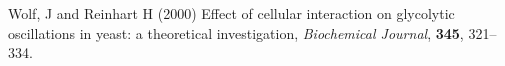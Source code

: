 \documentclass{bioinfo}
\begin{document}
\begin{thebibliography}{}
 Wolf, J and Reinhart H (2000) Effect of cellular interaction on glycolytic oscillations in yeast: a theoretical investigation, {\it Biochemical Journal}, {\bf 345}, 321--334.










\end{thebibliography}
\end{document}

